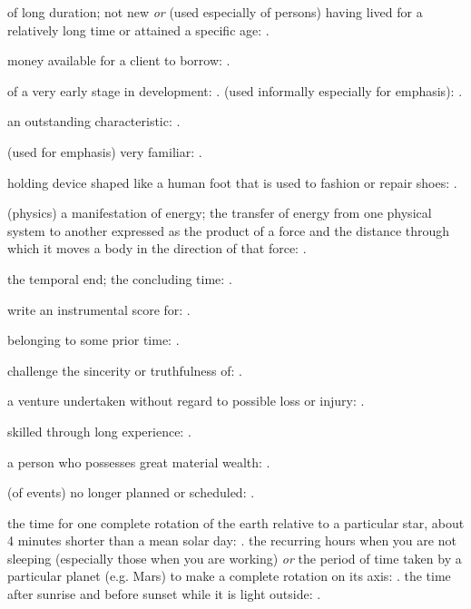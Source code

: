   of long duration; not new \textit{or} (used especially of persons) having lived for a relatively long time or attained a specific age: .

  money available for a client to borrow: .

  of a very early stage in development: . (used informally especially for emphasis):   .

  an outstanding characteristic:   .

  (used for emphasis) very familiar: .

  holding device shaped like a human foot that is used to fashion or repair shoes:   .

  (physics) a manifestation of energy; the transfer of energy from one physical system to another expressed as the product of a force and the distance through which it moves a body in the direction of that force: .

  the temporal end; the concluding time:   .

  write an instrumental score for:   .

  belonging to some prior time:   .

  challenge the sincerity or truthfulness of: .

  a venture undertaken without regard to possible loss or injury:   .

  skilled through long experience:   .

  a person who possesses great material wealth:   .

  (of events) no longer planned or scheduled:   .

  the time for one complete rotation of the earth relative to a particular star, about 4 minutes shorter than a mean solar day:   . the recurring hours when you are not sleeping (especially those when you are working) \textit{or} the period of time taken by a particular planet (e.g. Mars) to make a complete rotation on its axis: . the time after sunrise and before sunset while it is light outside:   .

